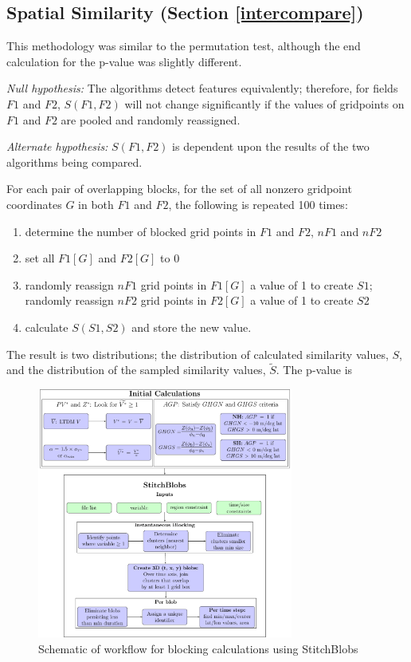 \documentclass[smallextended]{svjour3}       %
\numberwithin{equation}{section}
\begin{document}
\begin{appendices}
\subsection{Spatial Similarity (Section \ref{intercompare})}

This methodology was similar to the permutation test, although the end calculation for the p-value was slightly different. 

\textit{Null hypothesis:} The algorithms detect features equivalently; therefore, for fields $F1$ and $F2$, $S(F1,F2)$ will not change significantly if the values of gridpoints on $F1$ and $F2$ are pooled and randomly reassigned.

\noindent\textit{Alternate hypothesis:} $S(F1,F2)$ is dependent upon the results of the two algorithms being compared.

For each pair of overlapping blocks, for the set of all nonzero gridpoint coordinates $G$ in both $F1$ and $F2$, the following is repeated 100 times:
\begin{enumerate}
    \item determine the number of blocked grid points in $F1$ and $F2$, $nF1$ and $nF2$
    \item set all $F1[G]$ and $F2[G]$ to 0
    \item randomly reassign $nF1$ grid points in $F1[G]$ a value of 1 to create $S1$; randomly reassign $nF2$ grid points in $F2[G]$ a value of 1 to create $S2$
    \item calculate $S(S1,S2)$ and store the new value.
\end{enumerate}

The result is two distributions; the distribution of calculated similarity values, $S$, and the distribution of the sampled similarity values, $\widetilde{S}$. The p-value is 



\end{appendices}




\pagebreak

\begin{figure}
\centering
\includegraphics[width=0.75\textwidth]{fig1.pdf}
\caption{Schematic of workflow for blocking calculations using StitchBlobs}\label{stitchfig}
\end{figure}
\end{document}
